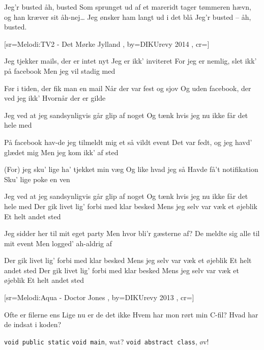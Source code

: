 \documentclass[pdftex,12pt]{article}
\begin{document}
\begin{songs}{}
\endverse
\beginverse
Jeg’r busted
åh, busted
Som sprunget ud af et mareridt
tager tømmeren hævn, og han kræver sit
åh-nej\ldots
Jeg ønsker ham langt ud i det blå
Jeg’r busted – åh, busted.

\endverse
\endsong



[sr={Melodi:TV2 - Det Mørke Jylland}
,
by={DIKUrevy 2014}
,
cr={}]\hypertarget{Facebookevents}{}
\label{song35}

\beginverse
Jeg tjekker mails, der er intet nyt
Jeg er ikk' inviteret
For jeg er nemlig, slet ikk' på facebook
Men jeg vil stadig med

\endverse
\beginverse
Før i tiden, der fik man en mail
Når der var fest og sjov
Og uden facebook, der ved jeg ikk'
Hvornår der er gilde

\endverse
\beginverse
Jeg ved at jeg sandsynligvis går glip af noget
Og tænk hvis jeg nu ikke får det hele med

\endverse
\beginverse
På facebook hav-de jeg tilmeldt mig
et så vildt event
Det var fedt, og jeg havd' glædet mig
Men jeg kom ikk' af sted

\endverse
\beginverse
(For) jeg sku' lige ha' tjekket min væg
Og like hvad jeg så
Havde få't notifikation
Sku' lige poke en ven

\endverse
\beginverse
Jeg ved at jeg sandsynligvis går glip af noget
Og tænk hvis jeg nu ikke får det hele med
Der gik livet lig' forbi med klar besked
Mens jeg selv var væk et øjeblik
Et helt andet sted

\endverse
\beginverse
Jeg sidder her til mit eget party
Men hvor bli'r gæsterne af?
De meldte sig alle til mit event
Men logged' ah-aldrig af

\endverse
\beginverse
Der gik livet lig' forbi med klar besked
Mens jeg selv var væk et øjeblik
Et helt andet sted
Der gik livet lig' forbi med klar besked
Mens jeg selv var væk et øjeblik
Et helt andet sted

\endverse
\endsong



﻿[sr={Melodi:Aqua - Doctor Jones}
,
by={DIKUrevy 2013}
,
cr={}]\hypertarget{diff}{}
\label{song36}

\beginverse
Ofte er filerne ens
Lige nu er de det ikke
Hvem har mon rørt min C-fil?
Hvad har de indsat i koden?

\endverse
\beginverse
\texttt{void public static}
\texttt{void main}, wat?
\texttt{void abstract class}, øv!


\end{songs}
\end{document}
